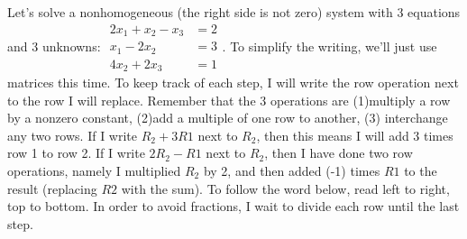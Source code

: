 \documentclass[10pt]{article}
\begin{document}
Let's solve a nonhomogeneous (the right side is not zero) system with 3 equations and 3 unknowns: {$\begin{array}{rl}
2x_1+x_2-x_3&=2\\
x_1-2x_2 &=3\\
4x_2+2x_3&=1
\end{array}$}. 
To simplify the writing, we'll just use matrices this time. To keep track of each step, I will write the row operation next to the row I will replace. Remember that the 3 operations are (1)multiply a row by a nonzero constant, (2)add a multiple of one row to another, (3) interchange any two rows.  If I write $R_2+3R1$ next to $R_2$, then this means I will add 3 times row 1 to row 2.  If I write $2R_2-R1$ next to $R_2$, then I have done two row operations, namely I multiplied $R_2$ by 2, and then added (-1) times $R1$ to the result (replacing $R2$ with the sum). To follow the word below, read left to right, top to bottom. In order to avoid fractions, I wait to divide each row until the last step.
\end{document}
